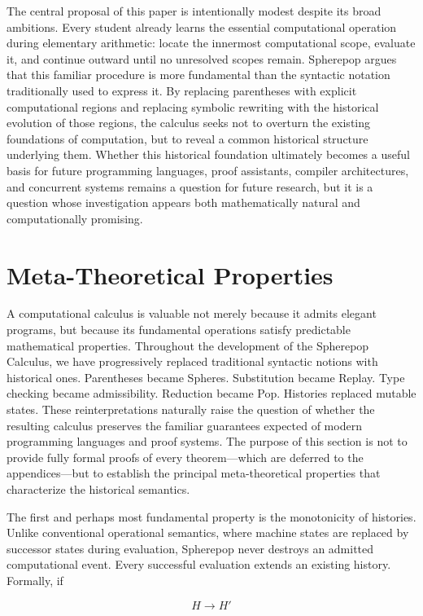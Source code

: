 \documentclass[12pt,oneside]{article}
\theoremstyle{definition}
\theoremstyle{remark}
\begin{document}
The central proposal of this paper is intentionally modest despite its broad
ambitions. Every student already learns the essential computational operation
during elementary arithmetic: locate the innermost computational scope,
evaluate it, and continue outward until no unresolved scopes remain.
Spherepop argues that this familiar procedure is more fundamental than the
syntactic notation traditionally used to express it. By replacing parentheses
with explicit computational regions and replacing symbolic rewriting with the
historical evolution of those regions, the calculus seeks not to overturn the
existing foundations of computation, but to reveal a common historical
structure underlying them. Whether this historical foundation ultimately
becomes a useful basis for future programming languages, proof assistants,
compiler architectures, and concurrent systems remains a question for future
research, but it is a question whose investigation appears both mathematically
natural and computationally promising.

\section{Meta-Theoretical Properties}

A computational calculus is valuable not merely because it admits elegant
programs, but because its fundamental operations satisfy predictable
mathematical properties. Throughout the development of the Spherepop Calculus,
we have progressively replaced traditional syntactic notions with historical
ones. Parentheses became Spheres. Substitution became Replay. Type checking
became admissibility. Reduction became Pop. Histories replaced mutable states.
These reinterpretations naturally raise the question of whether the resulting
calculus preserves the familiar guarantees expected of modern programming
languages and proof systems. The purpose of this section is not to provide
fully formal proofs of every theorem—which are deferred to the appendices—but
to establish the principal meta-theoretical properties that characterize the
historical semantics.

The first and perhaps most fundamental property is the monotonicity of
histories. Unlike conventional operational semantics, where machine states are
replaced by successor states during evaluation, Spherepop never destroys an
admitted computational event. Every successful evaluation extends an existing
history. Formally, if

\[
H
\longrightarrow
H'
\]
\end{document}
